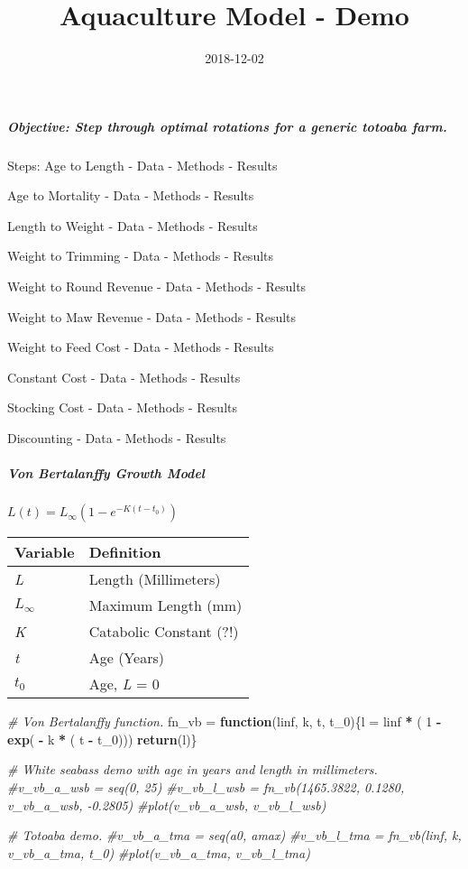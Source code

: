 \documentclass[]{article}
\title{Aquaculture Model - Demo}
\author{}
\date{2018-12-02}
\newenvironment{Shaded}{\begin{snugshade}}{\end{snugshade}}
\newcommand{\KeywordTok}[1]{\textcolor[rgb]{0.13,0.29,0.53}{\textbf{#1}}}
\newcommand{\DecValTok}[1]{\textcolor[rgb]{0.00,0.00,0.81}{#1}}
\newcommand{\StringTok}[1]{\textcolor[rgb]{0.31,0.60,0.02}{#1}}
\newcommand{\CommentTok}[1]{\textcolor[rgb]{0.56,0.35,0.01}{\textit{#1}}}
\newcommand{\ControlFlowTok}[1]{\textcolor[rgb]{0.13,0.29,0.53}{\textbf{#1}}}
\newcommand{\OperatorTok}[1]{\textcolor[rgb]{0.81,0.36,0.00}{\textbf{#1}}}
\newcommand{\NormalTok}[1]{#1}
\let\oldsubparagraph\subparagraph
\renewcommand{\subparagraph}[1]{\oldsubparagraph{#1}\mbox{}}
\begin{document}
\maketitle

\subparagraph{Objective: Step through optimal rotations for a generic
totoaba
farm.}\label{objective-step-through-optimal-rotations-for-a-generic-totoaba-farm.}

Steps: Age to Length - Data - Methods - Results

Age to Mortality - Data - Methods - Results

Length to Weight - Data - Methods - Results

Weight to Trimming - Data - Methods - Results

Weight to Round Revenue - Data - Methods - Results

Weight to Maw Revenue - Data - Methods - Results

Weight to Feed Cost - Data - Methods - Results

Constant Cost - Data - Methods - Results

Stocking Cost - Data - Methods - Results

Discounting - Data - Methods - Results

\subparagraph{Von Bertalanffy Growth
Model}\label{von-bertalanffy-growth-model}

\(L(t) = L_\infty ( 1 - e^{ - K ( t - t_0 )})\)

\begin{longtable}[]{@{}ll@{}}
\toprule
Variable & Definition\tabularnewline
\midrule
\endhead
\emph{L} & Length (Millimeters)\tabularnewline
\(L_\infty\) & Maximum Length (mm)\tabularnewline
\emph{K} & Catabolic Constant (?!)\tabularnewline
\emph{t} & Age (Years)\tabularnewline
\(t_0\) & Age, \emph{L} = 0\tabularnewline
\bottomrule
\end{longtable}

\begin{Shaded}
\begin{Highlighting}[]
\CommentTok{# Von Bertalanffy function.}
\NormalTok{fn_vb =}\StringTok{ }\ControlFlowTok{function}\NormalTok{(linf, k, t, t_}\DecValTok{0}\NormalTok{)\{l =}\StringTok{ }\NormalTok{linf }\OperatorTok{*}\StringTok{ }\NormalTok{( }\DecValTok{1} \OperatorTok{-}\StringTok{ }\KeywordTok{exp}\NormalTok{( }\OperatorTok{-}\StringTok{ }\NormalTok{k }\OperatorTok{*}\StringTok{ }\NormalTok{( t }\OperatorTok{-}\StringTok{ }\NormalTok{t_}\DecValTok{0}\NormalTok{)))}
                                  \KeywordTok{return}\NormalTok{(l)\}}

\CommentTok{# White seabass demo with age in years and length in millimeters.}
\CommentTok{#v_vb_a_wsb = seq(0, 25)}
\CommentTok{#v_vb_l_wsb = fn_vb(1465.3822, 0.1280, v_vb_a_wsb, -0.2805)}
\CommentTok{#plot(v_vb_a_wsb, v_vb_l_wsb)}


\CommentTok{# Totoaba demo.}
\CommentTok{#v_vb_a_tma = seq(a0, amax)}
\CommentTok{#v_vb_l_tma = fn_vb(linf, k, v_vb_a_tma, t_0)}
\CommentTok{#plot(v_vb_a_tma, v_vb_l_tma)}
\end{Highlighting}
\end{Shaded}
\end{document}
